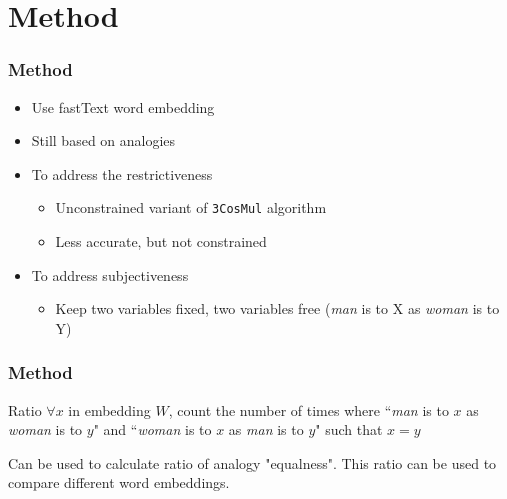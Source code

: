 \documentclass{beamer}
\begin{document}
\section{Method}
\begin{frame}
\frametitle{Method}
\begin{itemize}
    \item Use fastText word embedding
    \pause
    \item Still based on analogies
    \pause
    \item To address the restrictiveness
    \begin{itemize}
        \item Unconstrained variant of \texttt{3CosMul} algorithm 
        \item Less accurate, but not constrained
    \end{itemize}
    \pause
    \item To address subjectiveness
    \begin{itemize}
        \item Keep two variables fixed, two variables free
            \newline
        (\textit{man} is to X as \textit{woman} is to Y)
    \end{itemize}

\end{itemize}
\end{frame}

\begin{frame}
\frametitle{Method}
\begin{block}{Ratio}
$\forall x$ in embedding $W$, count the number of times where ``\textit{man} is to $x$ as \textit{woman} is to $y$" and ``\textit{woman} is to $x$ as \textit{man} is to $y$" such that $x=y$
\end{block}
Can be used to calculate ratio of analogy "equalness". This ratio can be used to
compare different word embeddings.

\end{frame}
\end{document}
